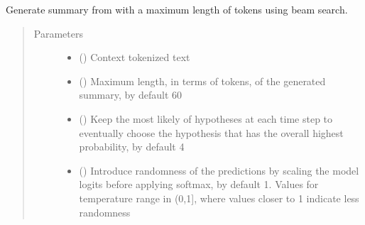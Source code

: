 \documentclass[letterpaper,10pt,english]{sphinxmanual}
\begin{document}
\begin{fulllineitems}
\begin{fulllineitems}
\label{\detokenize{code:gpt2_summarizer.GPT2Summarizer.generate_beam_sample}}
\sphinxAtStartPar
Generate summary from  with a maximum length of  tokens using
beam search.
\begin{quote}\begin{description}
\item[{Parameters}] \leavevmode\begin{itemize}
\item {} 
\sphinxAtStartPar
{} () \textendash{} Context tokenized text

\item {} 
\sphinxAtStartPar
{} (\sphinxstyleliteralemphasis{\sphinxupquote{, }}) \textendash{} Maximum length, in terms of tokens, of the generated summary, by default 60

\item {} 
\sphinxAtStartPar
{} (\sphinxstyleliteralemphasis{\sphinxupquote{, }}) \textendash{} Keep the most likely  of hypotheses at each time step to eventually
choose the hypothesis that has the overall highest probability, by default 4

\item {} 
\sphinxAtStartPar
{} (\sphinxstyleliteralemphasis{\sphinxupquote{, }}) \textendash{} Introduce randomness of the predictions by scaling the model logits before
applying softmax, by default 1. Values for temperature range in (0,1{]}, where
values closer to 1 indicate less randomness

\end{itemize}


\end{description}
\end{quote}
\end{fulllineitems}
\end{fulllineitems}
\end{document}
